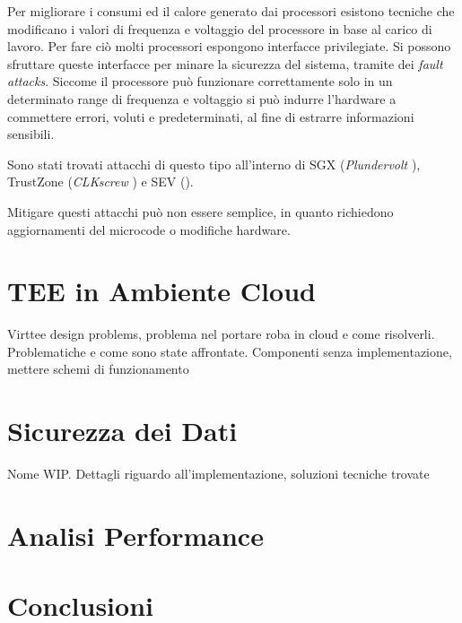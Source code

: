 \documentclass[12pt,italian]{report}
\begin{document}
	\bigbreak
	
	Per migliorare i consumi ed il calore generato dai processori esistono tecniche che modificano i valori di frequenza e voltaggio del processore in base al carico di lavoro. Per fare ciò molti processori espongono interfacce privilegiate. Si possono sfruttare queste interfacce per minare la sicurezza del sistema, tramite dei \textit{fault attacks}. Siccome il processore può funzionare correttamente solo in un determinato range di frequenza e voltaggio si può indurre l'hardware a commettere errori, voluti e predeterminati, al fine di estrarre informazioni sensibili.
	
	Sono stati trovati attacchi di questo tipo all'interno di SGX (\textit{Plundervolt} \cite{plundervolt}), TrustZone (\textit{CLKscrew} \cite{clkscrew}) e SEV (\cite{sev_power_attack}).
	
	Mitigare questi attacchi può non essere semplice, in quanto richiedono aggiornamenti del microcode o modifiche hardware.
	
	\chapter{TEE in Ambiente Cloud}
	\label{cap:problema}
	Virttee design problems, problema nel portare roba in cloud e come risolverli. Problematiche e come sono state affrontate. Componenti senza implementazione, mettere schemi di funzionamento
	
	\chapter{Sicurezza dei Dati}
	\label{cap:implementazione}
	Nome WIP. Dettagli riguardo all'implementazione, soluzioni tecniche trovate
	
	
	\chapter{Analisi Performance}
	\label{cap:dati}
	
	\chapter{Conclusioni}
	\label{cap:conclusioni}
	
	
	
\end{document}
